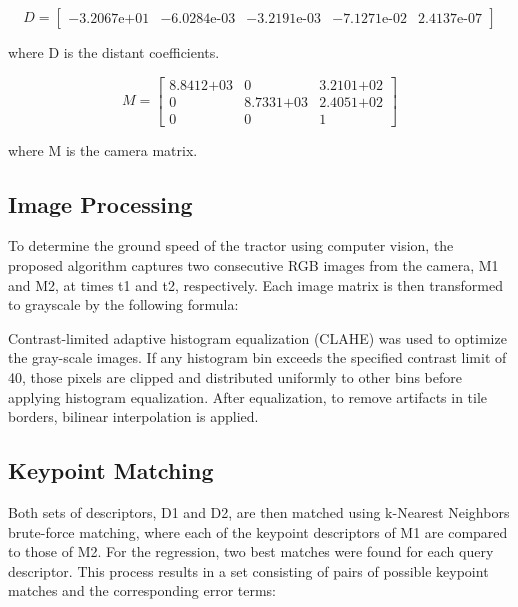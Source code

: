 \begin{equation}
  D =
  \begin{bmatrix}
    -3.2067\text{e+01} & -6.0284\text{e-03} & -3.2191\text{e-03} & -7.1271\text{e-02} & 2.4137\text{e-07} 
  \end{bmatrix}
\label{eq:dist_coefficients}
\end{equation}
\begin{flushleft}
where D is the distant coefficients.
\end{flushleft}

\begin{equation}
  M =
  \begin{bmatrix}
    8.8412\text{+03} & 0 & 3.2101\text{+02} \\
    0 & 8.7331\text{+03} & 2.4051\text{+02} \\
    0 & 0 & 1
  \end{bmatrix}
\label{eq:camera_matrix}
\end{equation}
\begin{flushleft}
where M is the camera matrix.
\end{flushleft}


\subsection{Image Processing}
To determine the ground speed of the tractor using computer vision,
the proposed algorithm captures two consecutive RGB images from the
camera, M1 and M2, at times t1 and t2, respectively. Each image matrix
is then transformed to grayscale by the following formula:

Contrast-limited adaptive histogram equalization (CLAHE) was used to
optimize the gray-scale images. If any histogram bin exceeds the
specified contrast limit of 40, those pixels are clipped and
distributed uniformly to other bins before applying histogram
equalization. After equalization, to remove artifacts in tile borders,
bilinear interpolation is applied.

\subsection{Keypoint Matching}
Both sets of descriptors, D1 and D2, are then matched using k-Nearest
Neighbors brute-force matching, where each of the keypoint descriptors
of M1 are compared to those of M2. For the regression, two best
matches were found for each query descriptor. This process results in
a set consisting of pairs of possible keypoint matches and the
corresponding error terms:

